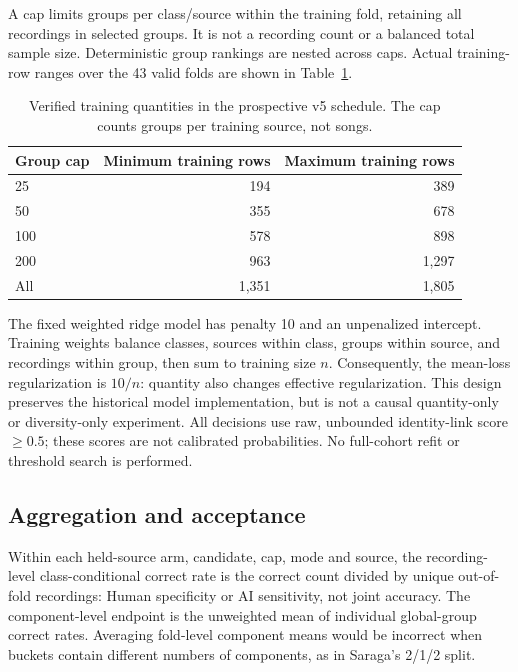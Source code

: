 A cap limits groups per class/source within the training fold, retaining all
recordings in selected groups. It is not a recording count or a balanced
total sample size. Deterministic group rankings are nested across caps.
Actual training-row ranges over the 43 valid folds are shown in
Table~\ref{tab:v5-caps}.

\begin{table}[htbp]
\centering
\caption{Verified training quantities in the prospective v5 schedule.
The cap counts groups per training source, not songs.}
\label{tab:v5-caps}
\begin{tabular}{lrr}
\toprule
Group cap & Minimum training rows & Maximum training rows \\
\midrule
25 & 194 & 389 \\
50 & 355 & 678 \\
100 & 578 & 898 \\
200 & 963 & 1,297 \\
All & 1,351 & 1,805 \\
\bottomrule
\end{tabular}
\end{table}

The fixed weighted ridge model has penalty 10 and an unpenalized intercept.
Training weights balance classes, sources within class, groups within source,
and recordings within group, then sum to training size $n$. Consequently,
the mean-loss regularization is $10/n$: quantity also changes effective
regularization. This design preserves the historical model implementation,
but is not a causal quantity-only or diversity-only experiment. All decisions
use raw, unbounded identity-link score $\geq 0.5$; these scores are not
calibrated probabilities. No full-cohort refit or threshold search is performed.

\subsection{Aggregation and acceptance}

Within each held-source arm, candidate, cap, mode and source, the recording-level
class-conditional correct rate is the correct count divided by unique
out-of-fold recordings: Human specificity or AI sensitivity, not joint accuracy.
The component-level endpoint is the unweighted mean of individual global-group
correct rates. Averaging fold-level component means would be incorrect when
buckets contain different numbers of components, as in Saraga's 2/1/2 split.

